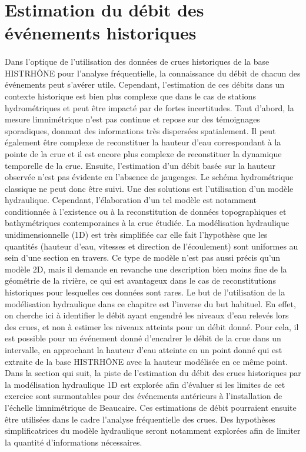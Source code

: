 \FloatBarrier

\section{Estimation du débit des événements historiques}
\label{sec:hydraul}
	\paragraph{} Dans l'optique de l'utilisation des données de crues historiques de la base HISTRHÔNE pour l'analyse fréquentielle, la connaissance du débit de chacun des événements peut s'avérer utile. Cependant, l'estimation de ces débits dans un contexte historique est bien plus complexe que dans le cas de stations hydrométriques et peut être impacté par de fortes incertitudes. Tout d'abord, la mesure limnimétrique n'est pas continue et repose sur des témoignages sporadiques, donnant des informations très dispersées spatialement. Il peut également être complexe de reconstituer la hauteur d'eau correspondant à la pointe de la crue et il est encore plus complexe de reconstituer la dynamique temporelle de la crue. Ensuite, l'estimation d'un débit basée sur la hauteur observée n'est pas évidente en l'absence de jaugeages. Le schéma hydrométrique classique ne peut donc être suivi. Une des solutions est l'utilisation d'un modèle hydraulique. Cependant, l'élaboration d'un tel modèle est notamment conditionnée à l'existence ou à la reconstitution de données topographiques et bathymétriques contemporaines à la crue étudiée. La modélisation hydraulique unidimensionnelle (1D) est très simplifiée car elle fait l'hypothèse que les quantités (hauteur d'eau, vitesses et direction de l'écoulement) sont uniformes au sein d'une section en travers. Ce type de modèle n'est pas aussi précis qu'un modèle 2D, mais il demande en revanche une description bien moins fine de la géométrie de la rivière, ce qui est avantageux dans le cas de reconstitutions historiques pour lesquelles ces données sont rares. Le but de l'utilisation de la modélisation hydraulique dans ce chapitre est l'inverse du but habituel. En effet, on cherche ici à identifier le débit ayant engendré les niveaux d'eau relevés lors des crues, et non à estimer les niveaux atteints pour un débit donné. Pour cela, il est possible pour un événement donné d'encadrer le débit de la crue dans un intervalle, en approchant la hauteur d'eau atteinte en un point donné qui est extraite de la base HISTRHÔNE avec la hauteur modélisée en ce même point. Dans la section qui suit, la piste de l'estimation du débit des crues historiques par la modélisation hydraulique 1D est explorée afin d'évaluer si les limites de cet exercice sont surmontables pour des événements antérieurs à l'installation de l'échelle limnimétrique de Beaucaire. Ces estimations de débit pourraient ensuite être utilisées dans le cadre l'analyse fréquentielle des crues. Des hypothèses simplificatrices du modèle hydraulique seront notamment explorées afin de limiter la quantité d'informations nécessaires.

